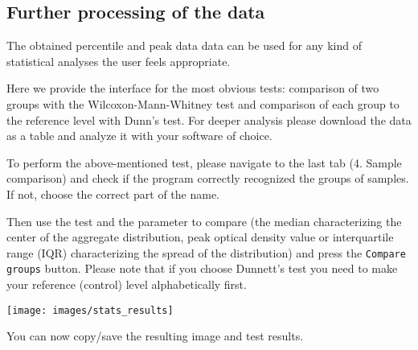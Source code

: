 \documentclass[11pt]{article}
\begin{document}
\begin{enumerate}
\subsection*{Further processing of the data}


The obtained percentile and peak data data can be used for any kind of statistical analyses the user feels appropriate. 

Here we provide the interface for the most obvious tests: comparison of two groups with the Wilcoxon-Mann-Whitney test and comparison of each group to the reference level with Dunn's test. For deeper analysis please download the data as a table and analyze it with your software of choice. 


To perform the above-mentioned test, please navigate to the last tab (4. Sample comparison) and check if the program correctly recognized the groups of samples. If not, choose the correct part of the name. 

Then use the test and the parameter to compare (the median characterizing the center of the aggregate distribution, peak optical density value or interquartile range (IQR) characterizing the spread of the distribution) and press the \texttt{Compare groups} button. Please note that if you choose Dunnett's test you need to make your reference (control) level alphabetically first.

\hskip -15mm \texttt{[image: images/stats\_results]}

You can now copy/save the resulting image and test results. 


\end{enumerate}
\end{document}
